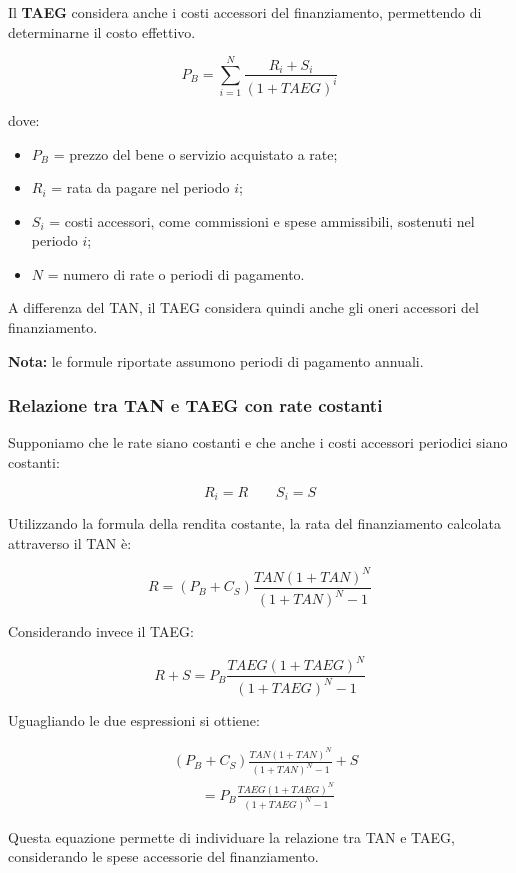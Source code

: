 \noindent Il \textbf{TAEG} considera anche i costi accessori
del finanziamento, permettendo di determinarne il costo
effettivo.

\[
\boxed{
P_B=
\sum_{i=1}^{N}
\frac{R_i+S_i}{(1+TAEG)^i}
}
\]

\noindent dove:

\begin{itemize}
    \item $P_B$ = prezzo del bene o servizio acquistato a rate;
    \item $R_i$ = rata da pagare nel periodo $i$;
    \item $S_i$ = costi accessori, come commissioni e spese
    ammissibili, sostenuti nel periodo $i$;
    \item $N$ = numero di rate o periodi di pagamento.
\end{itemize}

\noindent A differenza del TAN, il TAEG considera quindi
anche gli oneri accessori del finanziamento.

\medskip

\noindent \textbf{Nota:} le formule riportate assumono periodi
di pagamento annuali.

\subsubsection*{Relazione tra TAN e TAEG con rate costanti}

\noindent Supponiamo che le rate siano costanti e che
anche i costi accessori periodici siano costanti:

\[
R_i=R
\qquad
S_i=S
\]

\noindent Utilizzando la formula della rendita costante,
la rata del finanziamento calcolata attraverso il TAN è:

\[
\boxed{
R=(P_B+C_S)
\frac{TAN(1+TAN)^N}
{(1+TAN)^N-1}
}
\]

\noindent Considerando invece il TAEG:

\[
\boxed{
R+S=P_B
\frac{TAEG(1+TAEG)^N}
{(1+TAEG)^N-1}
}
\]

\noindent Uguagliando le due espressioni si ottiene:

\[
\begin{aligned}
&(P_B+C_S)
\frac{TAN(1+TAN)^N}
{(1+TAN)^N-1}+S\\
&\qquad =
P_B
\frac{TAEG(1+TAEG)^N}
{(1+TAEG)^N-1}
\end{aligned}
\]

\noindent Questa equazione permette di individuare la
relazione tra TAN e TAEG, considerando le spese
accessorie del finanziamento.

